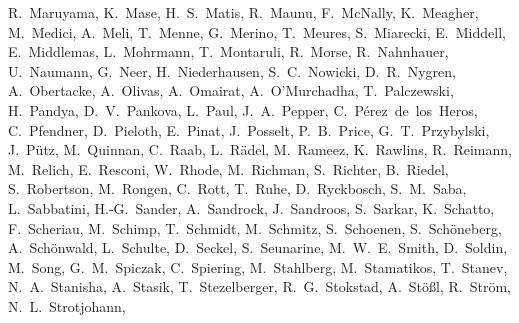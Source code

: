 \documentclass[manuscript]{aastex}
\begin{document}
{R.~Maruyama,
K.~Mase,
H.~S.~Matis,
R.~Maunu,
F.~McNally,
K.~Meagher,
M.~Medici,
A.~Meli,
T.~Menne,
G.~Merino,
T.~Meures,
S.~Miarecki,
E.~Middell,
E.~Middlemas,
L.~Mohrmann,
T.~Montaruli,
R.~Morse,
R.~Nahnhauer,
U.~Naumann,
G.~Neer,
H.~Niederhausen,
S.~C.~Nowicki,
D.~R.~Nygren,
A.~Obertacke,
A.~Olivas,
A.~Omairat,
A.~O'Murchadha,
T.~Palczewski,
H.~Pandya,
D.~V.~Pankova,
L.~Paul,
J.~A.~Pepper,
C.~P\'erez~de~los~Heros,
C.~Pfendner,
D.~Pieloth,
E.~Pinat,
J.~Posselt,
P.~B.~Price,
G.~T.~Przybylski,
J.~P\"utz,
M.~Quinnan,
C.~Raab,
L.~R\"adel,
M.~Rameez,
K.~Rawlins,
R.~Reimann,
M.~Relich,
E.~Resconi,
W.~Rhode,
M.~Richman,
S.~Richter,
B.~Riedel,
S.~Robertson,
M.~Rongen,
C.~Rott,
T.~Ruhe,
D.~Ryckbosch,
S.~M.~Saba,
L.~Sabbatini,
H.-G.~Sander,
A.~Sandrock,
J.~Sandroos,
S.~Sarkar,
K.~Schatto,
F.~Scheriau,
M.~Schimp,
T.~Schmidt,
M.~Schmitz,
S.~Schoenen,
S.~Sch\"oneberg,
A.~Sch\"onwald,
L.~Schulte,
D.~Seckel,
S.~Seunarine,
M.~W.~E.~Smith,
D.~Soldin,
M.~Song,
G.~M.~Spiczak,
C.~Spiering,
M.~Stahlberg,
M.~Stamatikos,
T.~Stanev,
N.~A.~Stanisha,
A.~Stasik,
T.~Stezelberger,
R.~G.~Stokstad,
A.~St\"o{\ss}l,
R.~Str\"om,
N.~L.~Strotjohann,
}
\end{document}
